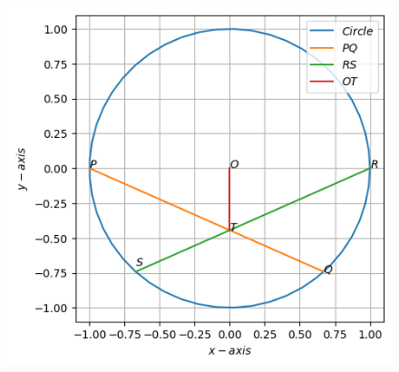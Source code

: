 \documentclass[12pt]{article}
\begin{document}
\begin{figure}[H]                             
	\centering
	\includegraphics[width=\columnwidth]{fig/9.10.4.3.png}                            
	\caption{}                              
	\label{9.10.4.3}
\end{figure}
\end{document}
